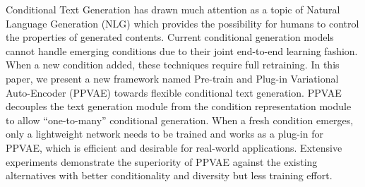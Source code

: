 Conditional Text Generation has drawn much attention as a topic of Natural Language Generation (NLG) which provides the possibility for humans to control the properties of generated contents. Current conditional generation models cannot handle emerging conditions due to their joint end-to-end learning fashion. When a new condition added, these techniques require full retraining. In this paper, we present a new framework named Pre-train and Plug-in Variational Auto-Encoder (PPVAE) towards flexible conditional text generation. PPVAE decouples the text generation module from the condition representation module to allow ``one-to-many'' conditional generation. When a fresh condition emerges, only a lightweight network needs to be trained and works as a plug-in for PPVAE, which is efficient and desirable for real-world applications. Extensive experiments demonstrate the superiority of PPVAE against the existing alternatives with better conditionality and diversity but less training effort.
